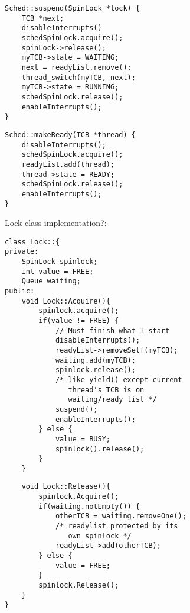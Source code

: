 \documentclass[8pt,landscape]{article}
\begin{document}
\begin{multicols}{3}
\begin{multicols}{2}
\begin{lstlisting}
\end{lstlisting}
\end{multicols}
\begin{multicols}{2}
\begin{lstlisting}
Sched::suspend(SpinLock *lock) { 
    TCB *next; 
    disableInterrupts()
    schedSpinLock.acquire();
    spinLock->release();
    myTCB->state = WAITING;
    next = readyList.remove();
    thread_switch(myTCB, next);
    myTCB->state = RUNNING; 
    schedSpinLock.release();
    enableInterrupts(); 
}
\end{lstlisting}
\columnbreak
\begin{lstlisting}
Sched::makeReady(TCB *thread) { 
    disableInterrupts();
    schedSpinLock.acquire();
    readyList.add(thread);
    thread->state = READY;
    schedSpinLock.release();
    enableInterrupts();
}
\end{lstlisting}
\end{multicols}
Lock class implementation?:
\begin{multicols}{2}
\begin{lstlisting}
class Lock::{
private:
    SpinLock spinlock;
    int value = FREE;
    Queue waiting;
public:
    void Lock::Acquire(){
        spinlock.acquire();
        if(value != FREE) {
            // Must finish what I start
            disableInterrupts();
            readyList->removeSelf(myTCB);
            waiting.add(myTCB);
            spinlock.release();
            /* like yield() except current
               thread's TCB is on 
               waiting/ready list */
            suspend();
            enableInterrupts();
        } else {
            value = BUSY;
            spinlock().release();
        }
    }
\end{lstlisting}
\columnbreak
\begin{lstlisting}
    void Lock::Release(){
        spinlock.Acquire();
        if(waiting.notEmpty()) {
            otherTCB = waiting.removeOne();
            /* readylist protected by its
               own spinlock */
            readyList->add(otherTCB);
        } else {
            value = FREE;
        }
        spinlock.Release();
    }
}
\end{lstlisting}
\end{multicols}







\end{multicols}
\end{document}
